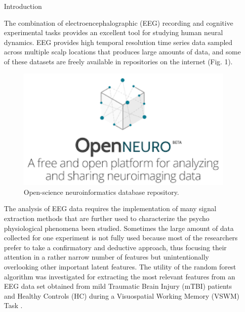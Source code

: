 \documentclass[final]{beamer}
\newlength{\sepwidth}
\newlength{\colwidth}
\newcommand{\separatorcolumn}{\begin{column}{\sepwidth}\end{column}}
\begin{document}
\begin{frame}[t]
\begin{columns}[t]
\separatorcolumn

\begin{column}{\colwidth}

  \begin{block}{Introduction}

    The combination of electroencephalographic (EEG) recording and cognitive experimental tasks provides an excellent tool for studying human neural dynamics. EEG provides high temporal resolution time series data sampled across multiple scalp locations that produces large amounts of data, and some of these datasets are freely available in repositories on the internet (Fig. 1). 

    \begin{figure}
      \centering
      \includegraphics[width=25cm]{img/bids2.png} 
      \caption{Open-science neuroinformatics database repository.}
    \end{figure}

    The analysis of EEG data requires the implementation of many signal extraction methods that are further used to characterize the psycho physiological phenomena been studied. Sometimes the large amount of data collected for one experiment is not fully used because most of the researchers prefer to take a confirmatory and deductive approach, thus focusing their attention in a rather narrow number of features but unintentionally overlooking other important latent  features.
    The utility of the random forest algorithm was investigated for extracting the most relevant features from an EEG data set obtained from mild Traumatic Brain Injury (mTBI) patients and Healthy Controls (HC) during a Visuospatial Working Memory (VSWM) Task \citep{ds003523}. 


\end{block}
\end{column}
\end{columns}
\end{frame}
\end{document}
